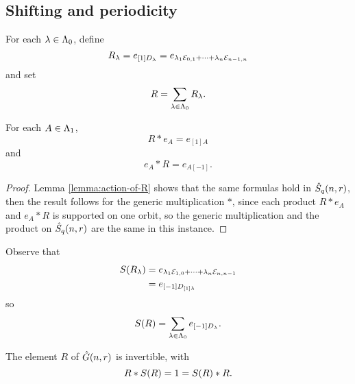 \documentclass[a4paper, 11pt]{report}
\begin{document}
\subsection{Shifting and periodicity}

For each $\lambda\in\Lambda_0{}$, define
\begin{equation*}
R_\lambda = e_{[1]D_{\lambda}} = e_{\lambda_1\mathcal{E}_{0,1} + \cdots + \lambda_n\mathcal{E}_{n-1,n}}
\end{equation*}
and set
\begin{equation*}
R=\sum_{\lambda\in\Lambda_0{}} R_\lambda.
\end{equation*}

\begin{lemma}\label{lemma:action-of-R-generic}
For each $A\in\Lambda_1{}$,
\begin{equation*}
R\ast e_A = e_{[1]A}
\end{equation*}
and
\begin{equation*}
e_A\ast R = e_{A[-1]}.
\end{equation*}
\end{lemma}

\begin{proof}
Lemma \ref{lemma:action-of-R} shows that the same formulas hold in $\hat{S}_q(n,r)$, then the result follows for the generic multiplication $\ast$, since each product $R\ast e_A$ and $e_A \ast R$ is supported on one orbit, so the generic multiplication and the product on $\hat{S}_q(n,r)$ are the same in this instance.
\end{proof} 

Observe that
\begin{align*}
S{(R_\lambda)} &= e_{\lambda_1\mathcal{E}_{1,0}+\cdots +\lambda_n\mathcal{E}_{n,n-1}}\\
&= e_{[-1]D_{[1]\lambda}}
\end{align*}
so
\begin{equation*}
S{(R)} = \sum_{\lambda\in\Lambda_0{}} e_{[-1]D_{\lambda}}.
\end{equation*}

\begin{lemma}\label{lemma:R-is-a-unit-generic}
The element $R$ of $\hat{G}(n,r)$ is invertible, with
\begin{equation*}
R \ast S{(R)} = 1 = S{(R)}\ast R.
\end{equation*}
\end{lemma}
\end{document}

